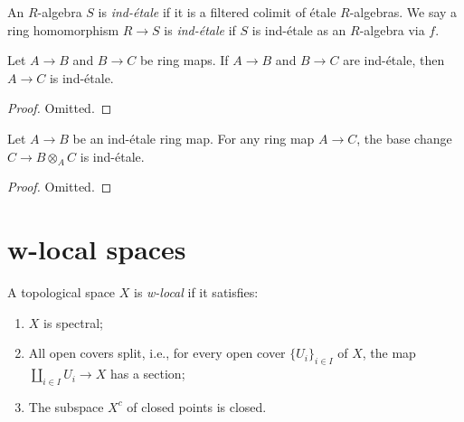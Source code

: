 \begin{definition}
    An $R$-algebra $S$ is \emph{ind-étale} if it is a filtered colimit of étale $R$-algebras.
    We say a ring homomorphism $R \to S$ is \emph{ind-étale} if $S$ is ind-étale as an $R$-algebra via $f$.
    \label{def:ind-etale}
\end{definition}

\begin{lemma}
  \label{thm:ind-etale-comp}
  Let $A \to B$ and $B \to C$ be ring maps. If $A \to B$ and $B \to C$ are ind-étale, then $A \to C$ is ind-étale.
\end{lemma}

\begin{proof}
  Omitted.
\end{proof}

\begin{lemma}
  \label{thm:ind-etale-base-change}
  Let $A \to B$ be an ind-étale ring map. For any ring map $A \to C$, the base change $C \to B \otimes_A C$ is ind-étale.
\end{lemma}

\begin{proof}
  Omitted.
\end{proof}

\section{w-local spaces}

\begin{definition}
    \label{def:w-local-space}
    \leanok
    A topological space \(X\) is \emph{w-local} if it satisfies:
    \begin{enumerate}
        \item \(X\) is spectral;
        \item All open covers split, i.e., for every open cover \(\{U_i\}_{i \in I}\) of \(X\), the map \(\coprod_{i \in I} U_i \to X\) has a section;
        \item The subspace \(X^c\) of closed points is closed.
    \end{enumerate}
\end{definition}

